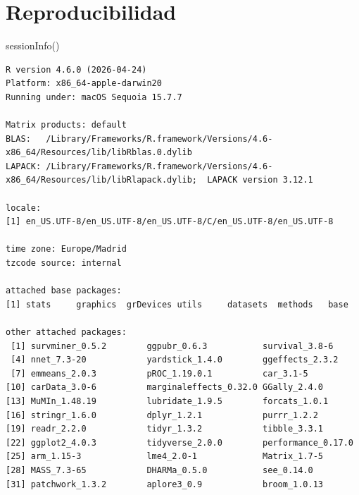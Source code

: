 \documentclass[
  letterpaper,
  DIV=11,
  numbers=noendperiod]{scrartcl}
\newenvironment{Shaded}{\begin{snugshade}}{\end{snugshade}}
\newcommand{\FunctionTok}[1]{\textcolor[rgb]{0.28,0.35,0.67}{#1}}
\newcommand{\NormalTok}[1]{\textcolor[rgb]{0.00,0.23,0.31}{#1}}
\begin{document}
\hypertarget{sec-repro}{%
\section{Reproducibilidad}\label{sec-repro}}

\begin{Shaded}
\begin{Highlighting}[]
\FunctionTok{sessionInfo}\NormalTok{()}
\end{Highlighting}
\end{Shaded}

\begin{verbatim}
R version 4.6.0 (2026-04-24)
Platform: x86_64-apple-darwin20
Running under: macOS Sequoia 15.7.7

Matrix products: default
BLAS:   /Library/Frameworks/R.framework/Versions/4.6-x86_64/Resources/lib/libRblas.0.dylib 
LAPACK: /Library/Frameworks/R.framework/Versions/4.6-x86_64/Resources/lib/libRlapack.dylib;  LAPACK version 3.12.1

locale:
[1] en_US.UTF-8/en_US.UTF-8/en_US.UTF-8/C/en_US.UTF-8/en_US.UTF-8

time zone: Europe/Madrid
tzcode source: internal

attached base packages:
[1] stats     graphics  grDevices utils     datasets  methods   base     

other attached packages:
 [1] survminer_0.5.2        ggpubr_0.6.3           survival_3.8-6        
 [4] nnet_7.3-20            yardstick_1.4.0        ggeffects_2.3.2       
 [7] emmeans_2.0.3          pROC_1.19.0.1          car_3.1-5             
[10] carData_3.0-6          marginaleffects_0.32.0 GGally_2.4.0          
[13] MuMIn_1.48.19          lubridate_1.9.5        forcats_1.0.1         
[16] stringr_1.6.0          dplyr_1.2.1            purrr_1.2.2           
[19] readr_2.2.0            tidyr_1.3.2            tibble_3.3.1          
[22] ggplot2_4.0.3          tidyverse_2.0.0        performance_0.17.0    
[25] arm_1.15-3             lme4_2.0-1             Matrix_1.7-5          
[28] MASS_7.3-65            DHARMa_0.5.0           see_0.14.0            
[31] patchwork_1.3.2        aplore3_0.9            broom_1.0.13          


\end{verbatim}
\end{document}
